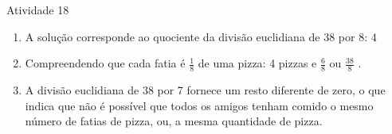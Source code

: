 \documentclass[oneside]{book}
\begin{document}
\begin{multicols}{2}
\begin{resposta*}{Atividade 18}
\begin{enumerate} [\quad a)] %
    \item       A solução corresponde ao quociente da divisão euclidiana de 38 por 8: 4
    \item       Compreendendo que cada fatia é       $\frac{1}{8}$        de uma pizza: 4 pizzas e       $\frac{6}{8}$       ou       $\frac{38}{8}$      .
    \item       A divisão euclidiana de 38 por 7 fornece um resto diferente de zero, o que indica que não é possível que todos os amigos tenham comido o mesmo número de fatias de pizza, ou, a mesma quantidade de pizza.
\end{enumerate} %
\end{resposta*}


\end{multicols}
\end{document}
